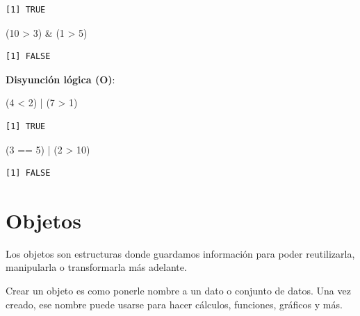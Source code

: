 \documentclass[
  letterpaper,
  DIV=11,
  numbers=noendperiod,
  twoside]{scrreprt}
\newenvironment{Shaded}{\begin{snugshade}}{\end{snugshade}}
\newcommand{\DecValTok}[1]{\textcolor[rgb]{0.68,0.00,0.00}{#1}}
\newcommand{\NormalTok}[1]{\textcolor[rgb]{0.00,0.23,0.31}{#1}}
\newcommand{\SpecialCharTok}[1]{\textcolor[rgb]{0.37,0.37,0.37}{#1}}
\begin{document}
\begin{verbatim}
[1] TRUE
\end{verbatim}

\begin{Shaded}
\begin{Highlighting}[]
\NormalTok{  (}\DecValTok{10} \SpecialCharTok{\textgreater{}} \DecValTok{3}\NormalTok{) }\SpecialCharTok{\&}\NormalTok{ (}\DecValTok{1} \SpecialCharTok{\textgreater{}} \DecValTok{5}\NormalTok{)  }
\end{Highlighting}
\end{Shaded}

\begin{verbatim}
[1] FALSE
\end{verbatim}

\textbf{Disyunción lógica (O)}:

\begin{Shaded}
\begin{Highlighting}[]
\NormalTok{  (}\DecValTok{4} \SpecialCharTok{\textless{}} \DecValTok{2}\NormalTok{) }\SpecialCharTok{|}\NormalTok{ (}\DecValTok{7} \SpecialCharTok{\textgreater{}} \DecValTok{1}\NormalTok{)   }
\end{Highlighting}
\end{Shaded}

\begin{verbatim}
[1] TRUE
\end{verbatim}

\begin{Shaded}
\begin{Highlighting}[]
\NormalTok{  (}\DecValTok{3} \SpecialCharTok{==} \DecValTok{5}\NormalTok{) }\SpecialCharTok{|}\NormalTok{ (}\DecValTok{2} \SpecialCharTok{\textgreater{}} \DecValTok{10}\NormalTok{) }
\end{Highlighting}
\end{Shaded}

\begin{verbatim}
[1] FALSE
\end{verbatim}

\chapter{Objetos}\label{objetos}

Los objetos son estructuras donde guardamos información para poder
reutilizarla, manipularla o transformarla más adelante.

Crear un objeto es como ponerle nombre a un dato o conjunto de datos.
Una vez creado, ese nombre puede usarse para hacer cálculos, funciones,
gráficos y más.
\end{document}
